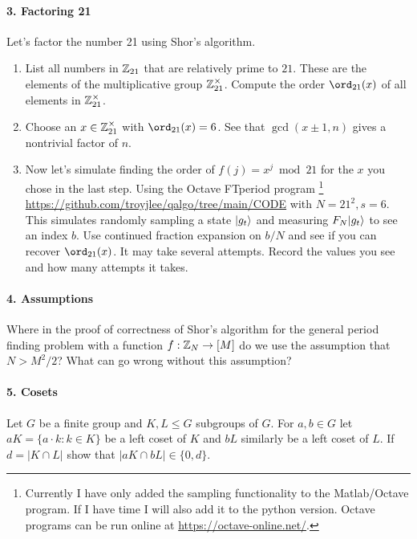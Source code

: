 \paragraph*{3. Factoring 21}
Let's factor the number 21 using Shor's algorithm.
\begin{enumerate}
  \item List all numbers in $\mathbb{Z}_{21}$ that are relatively prime to $21$.  These are the elements of the multiplicative group $\mathbb{Z}_{21}^\times$.  Compute 
  the order $\ord_{21}(x)$ of all elements in $\mathbb{Z}_{21}^\times$.
  \item Choose an $x \in \mathbb{Z}_{21}^\times$ with $\ord_{21}(x) = 6$.  See that $\gcd(x\pm 1, n)$ gives a nontrivial factor of $n$.
  \item Now let's simulate finding the order of $f(j) = x^j \bmod{21}$ for the $x$ you chose in the last step.  Using the Octave FTperiod program 
  \footnote{Currently I have only added the sampling functionality to the Matlab/Octave program.  If I have time I will also add it to the python version.  
  Octave programs can be run online at \url{https://octave-online.net/}.}
  \url{https://github.com/troyjlee/qalgo/tree/main/CODE} with $N = 21^2, s=6$.  This simulates randomly sampling a state $|g_t\rangle$ and 
  measuring $F_N |g_t\rangle$ to see an index $b$.  Use continued fraction expansion on $b/N$ and see if you can recover $\ord_{21}(x)$.  
  It may take several attempts.  Record the values you see and how many attempts it takes.
\end{enumerate}

\paragraph*{4. Assumptions} 
Where in the proof of correctness of Shor's algorithm for the general period finding problem with a function 
$f: \mathbb{Z}_N \rightarrow [M]$ do we use the assumption that $N > M^2/2$?  What can go wrong without this assumption?

\paragraph*{5. Cosets}
Let $G$ be a finite group and $K, L \le G$ subgroups of $G$.  For $a,b \in G$ let $aK = \{a \cdot k : k \in K\}$ 
be a left coset of $K$ and $bL$ similarly be a left coset of $L$.  If $d = |K \cap L|$ show that $|aK \cap bL| \in \{0,d\}$.  

